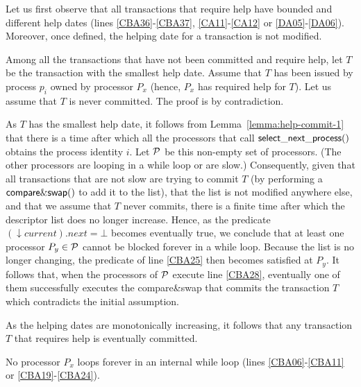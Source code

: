 \begin{proofL}
Let us first observe that all transactions that require help 
have bounded and different help dates  (lines \ref{CBA36}-\ref{CBA37}, 
 \ref{CA11}-\ref{CA12}  or \ref{DA05}-\ref{DA06}).  
Moreover,  once defined, the helping date for a transaction is not modified. 

Among all the transactions that  have not been committed and require help,
let  $T$  be the transaction with the smallest help date. 
Assume that  $T$ has been issued  by  process  $p_i$ owned  by processor
$P_x$  (hence,  $P_x$ has required  help for  $T$).  
Let us assume that $T$ is never committed. The proof  is by  contradiction. 


As $T$ has the smallest help date, it follows from 
Lemma~\ref{lemma:help-commit-1}  
that there is a time after  which all the processors that call 
${\sf select\_next\_process}()$  obtains the process identity $i$.
Let $\cal P$ be this non-empty set of processors. 
(The other processors are looping  in  a while loop or are slow.) 
Consequently, given that all transactions that are not slow are trying 
to commit  $T$ (by performing  a ${\sf compare\&swap}()$  to add it  to the
list), that the list is not modified anywhere else, and that we assume 
that $T$ never commits, there is a  finite time after which the descriptor 
list does no longer  increase. Hence, as  the  predicate  $(\downarrow
current).next=\bot$ becomes eventually true,  we conclude that at least one  
processor $P_y \in \cal P$ cannot 
be  blocked  forever in a  while  loop. Because the list is no
longer  changing, the predicate of line  \ref{CBA25} then becomes 
satisfied at $P_y$.
It follows that,  when  the processors  of  $\cal P$ execute line \ref{CBA28}, 
eventually one of them successfully executes the compare\&swap that commits 
the transaction $T$ which contradicts the initial assumption. 

As the helping dates are monotonically increasing, it follows that
any  transaction $T$ that requires help is eventually committed. 
\renewcommand{\toto}{lemma:helped-transaction}
\end{proofL}


\begin{lemma}
\label{lemma:no-infinite-loop}
No processor $P_x$ loops forever in an internal while loop
(lines \ref{CBA06}-\ref{CBA11} or  \ref{CBA19}-\ref{CBA24}). 
\end{lemma}

